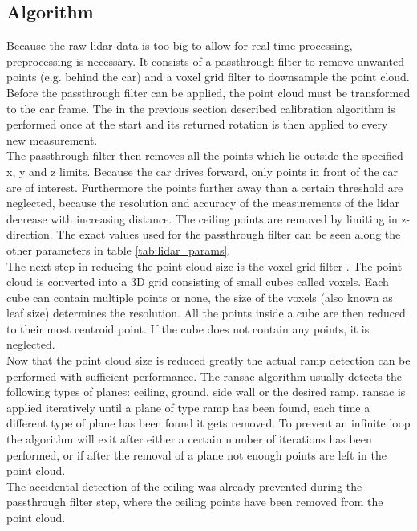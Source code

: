 \subsection{Algorithm}
Because the raw \acrshort{lidar} data is too big to allow for real time processing, preprocessing is necessary.
It consists of a passthrough filter to remove unwanted points (e.g. behind the car) and a voxel grid filter to downsample the point cloud.
Before the passthrough filter can be applied, the point cloud must be transformed to the car frame.
The in the previous section described calibration algorithm is performed once at the start and its returned rotation is then applied to every new measurement.\\
The passthrough filter then removes all the points which lie outside the specified x, y and z limits.
Because the car drives forward, only points in front of the car are of interest.
Furthermore the points further away than a certain threshold are neglected, because the resolution and accuracy of the measurements of the \acrshort{lidar} decrease with increasing distance.
The ceiling points are removed by limiting in z-direction.
The exact values used for the passthrough filter can be seen along the other parameters in table \ref{tab:lidar_params}.\\
The next step in reducing the point cloud size is the voxel grid filter \cite{Vosselman2004}.
The point cloud is converted into a 3D grid consisting of small cubes called voxels.
Each cube can contain multiple points or none, the size of the voxels (also known as leaf size) determines the resolution.
All the points inside a cube are then reduced to their most centroid point.
If the cube does not contain any points, it is neglected.\\
Now that the point cloud size is reduced greatly the actual ramp detection can be performed with sufficient performance.
The \acrshort{ransac} algorithm usually detects the following types of planes: ceiling, ground, side wall or the desired ramp.
\acrshort{ransac} is applied iteratively until a plane of type ramp has been found, each time a different type of plane has been found it gets removed.
To prevent an infinite loop the algorithm will exit after either a certain number of iterations has been performed, or if after the removal of a plane not enough points are left in the point cloud.\\
The accidental detection of the ceiling was already prevented during the passthrough filter step, where the ceiling points have been removed from the point cloud.
